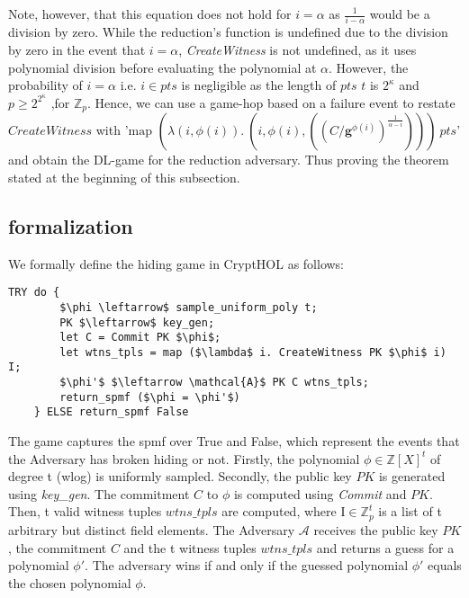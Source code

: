 Note, however, that this equation does not hold for  $i=\alpha$ as $\frac{1}{i-\alpha}$ would be a division by zero. While the reduction's function is undefined due to the division by zero in the event that $i=\alpha$,  \textit{CreateWitness} is not undefined, as it uses polynomial division before evaluating the polynomial at $\alpha$.
However, the probability of $i=\alpha$ i.e. $i\in pts$ is negligible as the length of $pts$ $t$ is $2^\kappa$ and $p\ge 2^{2^\kappa}$ ,for $\mathbb{Z}_p$. Hence, we can use a game-hop based on a failure event to restate $CreateWitness$ with '$\text{map } (\lambda (i,\phi(i)).\ (i,\phi(i), ((C/\mathbf{g}^{\phi(i)})^{\frac{1}{\alpha-i}})))\ pts$' and obtain the DL-game for the reduction adversary. Thus proving the theorem stated at the beginning of this subsection.

 
\subsection{formalization}
\label{security:hiding:formalization}
We formally define the hiding game in CryptHOL as follows:
\begin{lstlisting}[language=isabelle]
    TRY do {
        $\phi \leftarrow$ sample_uniform_poly t;
        PK $\leftarrow$ key_gen;
        let C = Commit PK $\phi$;
        let wtns_tpls = map ($\lambda$ i. CreateWitness PK $\phi$ i) I;
        $\phi'$ $\leftarrow \mathcal{A}$ PK C wtns_tpls;
        return_spmf ($\phi = \phi'$)
    } ELSE return_spmf False
\end{lstlisting}
The game captures the spmf over True and False, which represent the events that the Adversary has broken hiding or not.
Firstly, the polynomial $\phi\in\mathbb{Z}[X]^t$ of degree t (wlog) is uniformly sampled.
Secondly, the public key $PK$ is generated using \textit{key\_gen}. 
The commitment $C$ to $\phi$ is computed using \textit{Commit} and $PK$. Then, t valid witness tuples $wtns\_tpls$ are computed, where $\text{I}\in\mathbb{Z}_p^t$ is a list of t arbitrary but distinct field elements.
The Adversary $\mathcal{A}$ receives the public key $PK$, the commitment $C$ and the t witness tuples $wtns\_tpls$ and returns a guess for a polynomial $\phi'$.
The adversary wins if and only if the guessed polynomial $\phi'$ equals the chosen polynomial $\phi$.

